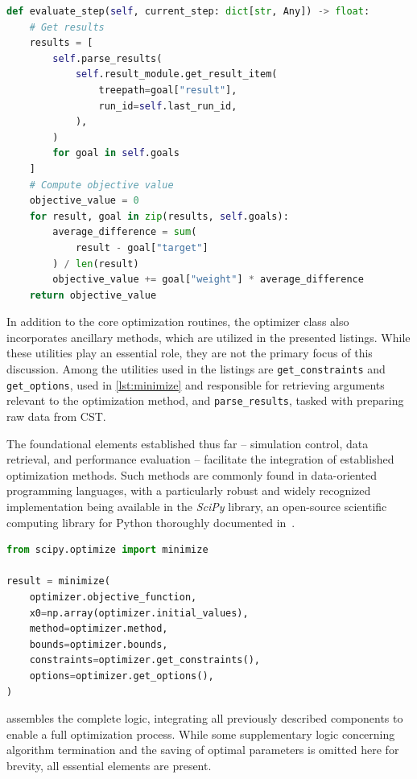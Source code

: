 \documentclass[11pt,a4paper,twoside,openany]{report}
\begin{document}
\begin{lstlisting}[caption={Optimization step evaluation}, label={lst:evaluate_step}, language=Python]
def evaluate_step(self, current_step: dict[str, Any]) -> float:
    # Get results
    results = [
        self.parse_results(
            self.result_module.get_result_item(
                treepath=goal["result"],
                run_id=self.last_run_id,
            ),
        )
        for goal in self.goals
    ]
    # Compute objective value
    objective_value = 0
    for result, goal in zip(results, self.goals):
        average_difference = sum(
            result - goal["target"]
        ) / len(result)
        objective_value += goal["weight"] * average_difference
    return objective_value
\end{lstlisting}

In addition to the core optimization routines, the optimizer class also incorporates ancillary methods, which are utilized in the presented listings. While these utilities play an essential role, they are not the primary focus of this discussion.  Among the utilities used in the listings are \texttt{get\_constraints} and \texttt{get\_options}, used in \cref{lst:minimize} and responsible for retrieving arguments relevant to the optimization method, and \texttt{parse\_results}, tasked with preparing raw data from CST.

The foundational elements established thus far -- simulation control, data retrieval, and performance evaluation -- facilitate the integration of established optimization methods. Such methods are commonly found in data-oriented programming languages, with a particularly robust and widely recognized implementation being available in the \emph{SciPy} library, an open-source scientific computing library for Python thoroughly documented in~\parencite{virtanen-et-al:scipy}.

\begin{lstlisting}[caption={Use of CSTOptimizer with SciPy}, label={lst:minimize}, language=Python]
from scipy.optimize import minimize

result = minimize(
    optimizer.objective_function,
    x0=np.array(optimizer.initial_values),
    method=optimizer.method,
    bounds=optimizer.bounds,
    constraints=optimizer.get_constraints(),
    options=optimizer.get_options(),
)
\end{lstlisting}

 assembles the complete logic, integrating all previously described components to enable a full optimization process. While some supplementary logic concerning algorithm termination and the saving of optimal parameters is omitted here for brevity, all essential elements are present.
\end{document}
